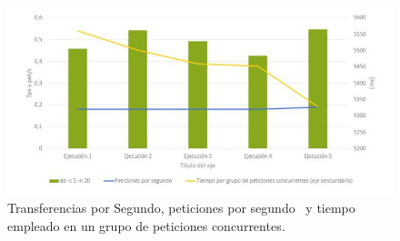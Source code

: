 \documentclass[11pt,twoside,a4paper]{book}
\begin{document}
\begin{figure}[H]
   \includegraphics[width=\textwidth]{grafica1.jpg}
   \caption{Transferencias por Segundo, peticiones por segundo \
   y tiempo empleado en un grupo de peticiones concurrentes.}
   \label{Fig1}
\end{figure}
\end{document}
